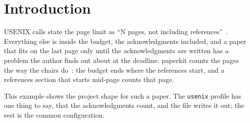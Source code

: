 \section{Introduction}

USENIX calls state the page limit as ``N pages, not including
references''~\cite{usenix}. Everything else is inside the budget, the
acknowledgments included, and a paper that fits on the last page only until
the acknowledgments are written has a problem the author finds out about at
the deadline. paperkit counts the pages the way the chairs
do~\cite{reproducible}: the budget ends where the references start, and a
references section that starts mid-page counts that page.

This example shows the project shape for such a paper. The \texttt{usenix}
profile has one thing to say, that the acknowledgments count, and the file
writes it out; the rest is the common configuration.
